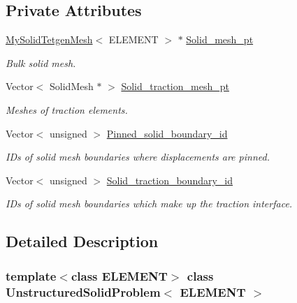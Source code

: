 \subsection*{Private Attributes}
\begin{DoxyCompactItemize}
\item 
\hyperlink{classMySolidTetgenMesh}{My\+Solid\+Tetgen\+Mesh}$<$ E\+L\+E\+M\+E\+NT $>$ $\ast$ \hyperlink{classUnstructuredSolidProblem_ad6a8cbe2c2f3596385e1a2484bfb68f7}{Solid\+\_\+mesh\+\_\+pt}
\begin{DoxyCompactList}\small\item\em Bulk solid mesh. \end{DoxyCompactList}\item 
Vector$<$ Solid\+Mesh $\ast$ $>$ \hyperlink{classUnstructuredSolidProblem_a32e691a698667053003e21333fc65057}{Solid\+\_\+traction\+\_\+mesh\+\_\+pt}
\begin{DoxyCompactList}\small\item\em Meshes of traction elements. \end{DoxyCompactList}\item 
Vector$<$ unsigned $>$ \hyperlink{classUnstructuredSolidProblem_a62ea7d593eaac6a3a0f0455c4a3fd805}{Pinned\+\_\+solid\+\_\+boundary\+\_\+id}
\begin{DoxyCompactList}\small\item\em I\+Ds of solid mesh boundaries where displacements are pinned. \end{DoxyCompactList}\item 
Vector$<$ unsigned $>$ \hyperlink{classUnstructuredSolidProblem_a4cf906bac719c9a942c04bda2798080f}{Solid\+\_\+traction\+\_\+boundary\+\_\+id}
\begin{DoxyCompactList}\small\item\em I\+Ds of solid mesh boundaries which make up the traction interface. \end{DoxyCompactList}\end{DoxyCompactItemize}


\subsection{Detailed Description}
\subsubsection*{template$<$class E\+L\+E\+M\+E\+NT$>$\newline
class Unstructured\+Solid\+Problem$<$ E\+L\+E\+M\+E\+N\+T $>$}


